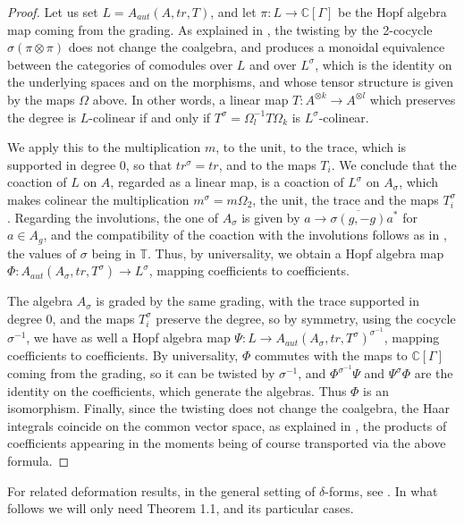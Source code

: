 \documentclass[11pt]{amsart}
\theoremstyle{definition}
\begin{document}
\begin{proof}
Let us set $L=A_{aut}(A,tr,T)$, and let $\pi:L\to\mathbb C[\Gamma]$ be the Hopf algebra map coming from the grading. As explained in \cite{doi,maj}, the twisting by the 2-cocycle $\sigma(\pi\otimes\pi)$ does not change the coalgebra, and produces a monoidal equivalence between the categories of comodules over $L$ and over $L^\sigma$, which is the identity on the underlying spaces and on the morphisms, and whose tensor structure is given by the maps $\Omega$ above. In other words, a linear map $T:A^{\otimes k}\to A^{\otimes l}$ which preserves the degree is $L$-colinear if and only if $T^\sigma=\Omega_l^{-1}T\Omega_k$ is $L^\sigma$-colinear.

We apply this to the multiplication $m$, to the unit, to the trace, which is supported in degree $0$, so that $tr^\sigma=tr$, and to the maps $T_i$. We conclude that the coaction of $L$ on $A$, regarded as a linear map, is a coaction of $L^\sigma$ on $A_\sigma$, which makes colinear the multiplication $m^\sigma=m\Omega_2$, the unit, the trace and the maps $T_i^\sigma$. Regarding the involutions, the one of $A_\sigma$ is given by $a\to\overline{\sigma(g,-g)}a^*$ for $a\in A_g$, and the compatibility of the coaction with the involutions follows as in \cite{bbc}, the values of $\sigma$ being in $\mathbb T$. Thus, by universality, we obtain a Hopf algebra map $\Phi:A_{aut}(A_\sigma,tr,T^\sigma)\to L^\sigma$, mapping coefficients to coefficients.

The algebra $A_\sigma$ is graded by the same grading, with the trace supported in degree $0$, and the maps $T_i^\sigma$ preserve the degree, so by symmetry, using the cocycle $\sigma^{-1}$, we have as well a Hopf algebra map $\Psi:L\to A_{aut}(A_\sigma,tr,T^\sigma)^{\sigma^{-1}}$, mapping coefficients to coefficients. By universality, $\Phi$ commutes with the maps to $\mathbb C[\Gamma]$ coming from the grading, so it can be twisted by $\sigma^{-1}$, and $\Phi^{\sigma^{-1}}\Psi$ and $\Psi^\sigma\Phi$ are the identity on the coefficients, which generate the algebras. Thus $\Phi$ is an isomorphism. Finally, since the twisting does not change the coalgebra, the Haar integrals coincide on the common vector space, as explained in \cite{bbc}, the products of coefficients appearing in the moments being of course transported via the above formula.
\end{proof}

For related deformation results, in the general setting of $\delta$-forms, see \cite{behy}. In what follows we will only need Theorem 1.1, and its particular cases.
\end{document}
